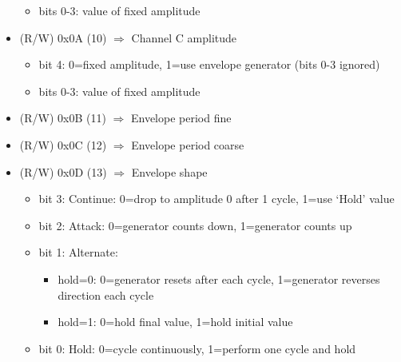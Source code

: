 \begin{itemize}
\begin{itemize}
  \item bits 0-3: value of fixed amplitude
  \end{itemize}
\item (R/W) 0x0A (10) $\Rightarrow$ Channel C amplitude
  \begin{itemize}
  \item bit 4: 0=fixed amplitude, 1=use envelope generator (bits 0-3 ignored)
  \item bits 0-3: value of fixed amplitude
  \end{itemize}
\item (R/W) 0x0B (11) $\Rightarrow$ Envelope period fine
\item (R/W) 0x0C (12) $\Rightarrow$ Envelope period coarse
\item (R/W) 0x0D (13) $\Rightarrow$ Envelope shape
  \begin{itemize}
  \item bit 3: Continue: 0=drop to amplitude 0 after 1 cycle, 1=use ‘Hold’ value
  \item bit 2: Attack: 0=generator counts down, 1=generator counts up
  \item bit 1: Alternate:
    \begin{itemize}
    \item hold=0: 0=generator resets after each cycle, 1=generator
      reverses direction each cycle
    \item hold=1: 0=hold final value, 1=hold initial value
    \end{itemize}
  \item bit 0: Hold: 0=cycle continuously, 1=perform one cycle and hold
  \end{itemize}
\end{itemize}

